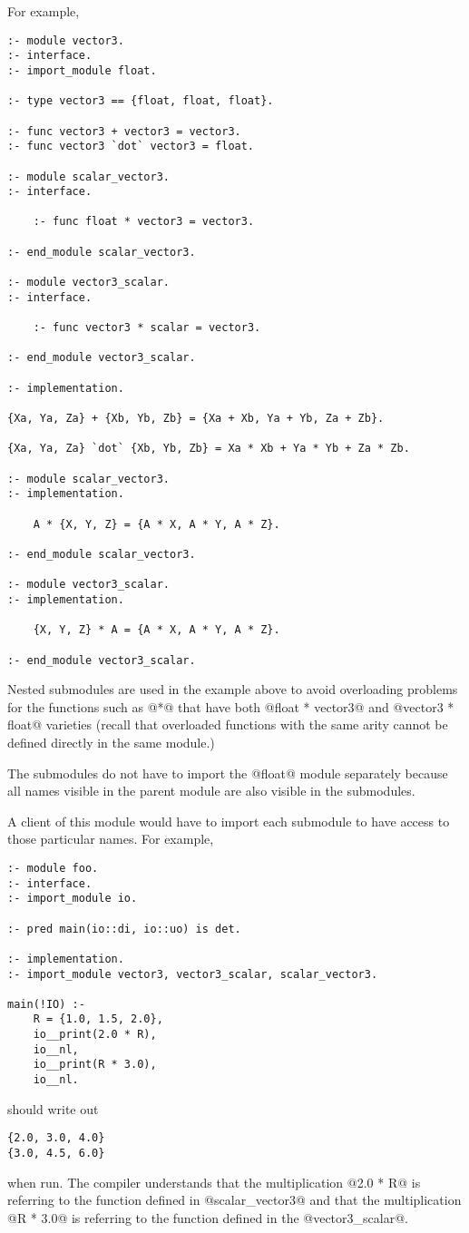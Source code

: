 \documentclass[a4paper,11pt,notitlepage,onecolumn]{article}
\begin{document}
For example,
\begin{verbatim}
:- module vector3.
:- interface.
:- import_module float.

:- type vector3 == {float, float, float}.

:- func vector3 + vector3 = vector3.
:- func vector3 `dot` vector3 = float.

:- module scalar_vector3.
:- interface.

    :- func float * vector3 = vector3.

:- end_module scalar_vector3.

:- module vector3_scalar.
:- interface.

    :- func vector3 * scalar = vector3.

:- end_module vector3_scalar.
    
:- implementation.

{Xa, Ya, Za} + {Xb, Yb, Zb} = {Xa + Xb, Ya + Yb, Za + Zb}.

{Xa, Ya, Za} `dot` {Xb, Yb, Zb} = Xa * Xb + Ya * Yb + Za * Zb.

:- module scalar_vector3.
:- implementation.

    A * {X, Y, Z} = {A * X, A * Y, A * Z}.

:- end_module scalar_vector3.

:- module vector3_scalar.
:- implementation.

    {X, Y, Z} * A = {A * X, A * Y, A * Z}.

:- end_module vector3_scalar.
\end{verbatim}
Nested submodules are used in the example above to avoid overloading
problems for the functions such as @*@ that have both @float * vector3@
and @vector3 * float@ varieties (recall that overloaded functions with
the same arity cannot be defined directly in the same module.)

The submodules do not have to import the @float@ module separately
because all names visible in the parent module are also visible in the
submodules.

A client of this module would have to import each submodule to have
access to those particular names.  For example,
\begin{verbatim}
:- module foo.
:- interface.
:- import_module io.

:- pred main(io::di, io::uo) is det.

:- implementation.
:- import_module vector3, vector3_scalar, scalar_vector3.

main(!IO) :-
    R = {1.0, 1.5, 2.0},
    io__print(2.0 * R),
    io__nl,
    io__print(R * 3.0),
    io__nl.
\end{verbatim}
should write out
\begin{verbatim}
{2.0, 3.0, 4.0}
{3.0, 4.5, 6.0}
\end{verbatim}
when run.  The compiler understands that the multiplication @2.0 * R@
is referring to the function defined in @scalar_vector3@ and that the
multiplication @R * 3.0@ is referring to the function defined in the
@vector3_scalar@.
\end{document}
